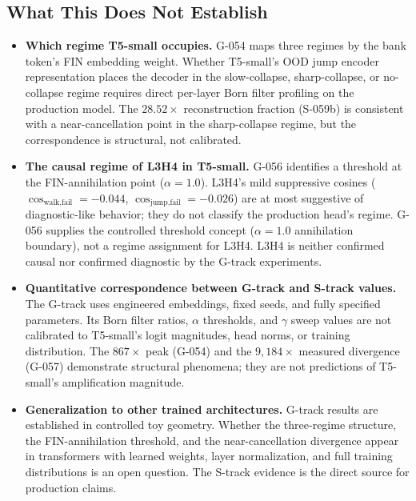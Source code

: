 \subsection{What This Does Not Establish}

\begin{itemize}
  \item \textbf{Which regime T5-small occupies.}
    G-054 maps three regimes by the bank token's FIN embedding weight.
    Whether T5-small's OOD jump encoder representation places the decoder in the
    slow-collapse, sharp-collapse, or no-collapse regime requires direct per-layer
    Born filter profiling on the production model.
    The $28.52\times$ reconstruction fraction (S-059b) is consistent with a near-cancellation
    point in the sharp-collapse regime, but the correspondence is structural, not calibrated.

  \item \textbf{The causal regime of L3H4 in T5-small.}
    G-056 identifies a threshold at the FIN-annihilation point ($\alpha=1.0$).
    L3H4's mild suppressive cosines ($\cos_\text{walk,fail}=-0.044$,
    $\cos_\text{jump,fail}=-0.026$) are at most suggestive of diagnostic-like behavior;
    they do not classify the production head's regime.
    G-056 supplies the controlled threshold concept ($\alpha=1.0$ annihilation boundary),
    not a regime assignment for L3H4.
    L3H4 is neither confirmed causal nor confirmed diagnostic by the G-track experiments.

  \item \textbf{Quantitative correspondence between G-track and S-track values.}
    The G-track uses engineered embeddings, fixed seeds, and fully specified parameters.
    Its Born filter ratios, $\alpha$ thresholds, and $\gamma$ sweep values are not
    calibrated to T5-small's logit magnitudes, head norms, or training distribution.
    The $867\times$ peak (G-054) and the $9{,}184\times$ measured divergence (G-057)
    demonstrate structural phenomena; they are not predictions of T5-small's amplification
    magnitude.

  \item \textbf{Generalization to other trained architectures.}
    G-track results are established in controlled toy geometry.
    Whether the three-regime structure, the FIN-annihilation threshold, and the
    near-cancellation divergence appear in transformers with learned weights,
    layer normalization, and full training distributions is an open question.
    The S-track evidence is the direct source for production claims.
\end{itemize}
